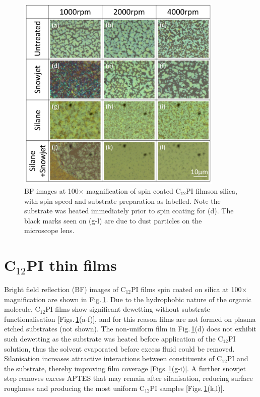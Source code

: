 \begin{figure}[h!]
\centering    
\includegraphics[width=0.88\textwidth]{Fig1}
\caption{BF images at 100$\times$ magnification of spin coated C$_{12}$PI filmson silica, with spin speed and substrate preparation as labelled. Note the substrate was heated immediately prior to spin coating for (d). The black marks seen on (g-l) are due to dust particles on the microscope lens.}
\label{4Fig1}
\end{figure}
\section{C$_{12}$PI thin films}
\label{sec:4-1}
Bright field reflection (BF) images of C$_{12}$PI films spin coated on silica at 100$\times$ magnification are shown in Fig.\,\ref{4Fig1}. Due to the hydrophobic nature of the organic molecule, C$_{12}$PI films show significant dewetting without substrate functionalisation [Figs.\,\ref{4Fig1}(a-f)], and for this reason films are not formed on plasma etched substrates (not shown). The non-uniform film in Fig.\,\ref{4Fig1}(d) does not exhibit such dewetting as the substrate was heated before application of the C$_{12}$PI solution, thus the solvent evaporated before excess fluid could be removed. Silanisation increases attractive interactions between constituents of C$_{12}$PI and the substrate, thereby improving film coverage [Figs.\,\ref{4Fig1}(g-i)]. A further snowjet step removes excess APTES that may remain after silanisation, reducing surface roughness and producing the most uniform C$_{12}$PI samples [Figs.\,\ref{4Fig1}(k,l)].

